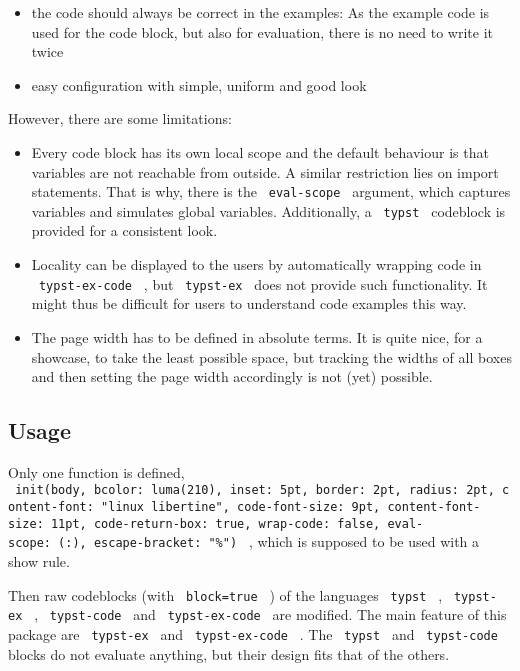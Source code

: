 \begin{itemize}
\tightlist
\item
  the code should always be correct in the examples: As the example code
  is used for the code block, but also for evaluation, there is no need
  to write it twice
\item
  easy configuration with simple, uniform and good look
\end{itemize}

However, there are some limitations:

\begin{itemize}
\tightlist
\item
  Every code block has its own local scope and the default behaviour is
  that variables are not reachable from outside. A similar restriction
  lies on import statements. That is why, there is the
  \texttt{\ eval-scope\ } argument, which captures variables and
  simulates global variables. Additionally, a \texttt{\ typst\ }
  codeblock is provided for a consistent look.
\item
  Locality can be displayed to the users by automatically wrapping code
  in \texttt{\ typst-ex-code\ } , but \texttt{\ typst-ex\ } does not
  provide such functionality. It might thus be difficult for users to
  understand code examples this way.
\item
  The page width has to be defined in absolute terms. It is quite nice,
  for a showcase, to take the least possible space, but tracking the
  widths of all boxes and then setting the page width accordingly is not
  (yet) possible.
\end{itemize}

\subsection{Usage}\label{usage}

Only one function is defined,
\texttt{\ init(body,\ bcolor:\ luma(210),\ inset:\ 5pt,\ border:\ 2pt,\ radius:\ 2pt,\ content-font:\ "linux\ libertine",\ code-font-size:\ 9pt,\ content-font-size:\ 11pt,\ code-return-box:\ true,\ wrap-code:\ false,\ eval-scope:\ (:),\ escape-bracket:\ "\%")\ }
, which is supposed to be used with a show rule.

Then raw codeblocks (with \texttt{\ block=true\ } ) of the languages
\texttt{\ typst\ } , \texttt{\ typst-ex\ } , \texttt{\ typst-code\ } and
\texttt{\ typst-ex-code\ } are modified. The main feature of this
package are \texttt{\ typst-ex\ } and \texttt{\ typst-ex-code\ } . The
\texttt{\ typst\ } and \texttt{\ typst-code\ } blocks do not evaluate
anything, but their design fits that of the others.

